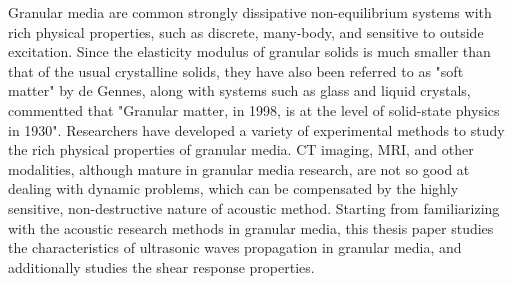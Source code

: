%

\begin{digest}

    Granular media are common strongly dissipative non-equilibrium systems with rich physical properties, such as discrete, many-body, and sensitive to outside excitation.
    Since the elasticity modulus of granular solids is much smaller than that of the usual crystalline solids, they have also been referred to as "soft matter" by de Gennes, along with systems such as glass and liquid crystals, commentted that "Granular matter, in 1998, is at the level of solid-state physics in 1930". 
    Researchers have developed a variety of experimental methods to study the rich physical properties of granular media.
    CT imaging, MRI, and other modalities, although mature in granular media research, are not so good at dealing with dynamic problems, which can be compensated by the highly sensitive, non-destructive nature of acoustic method.
    Starting from familiarizing with the acoustic research methods in granular media, this thesis paper studies the characteristics of ultrasonic waves propagation in granular media, and additionally studies the shear response properties.



\end{digest}
